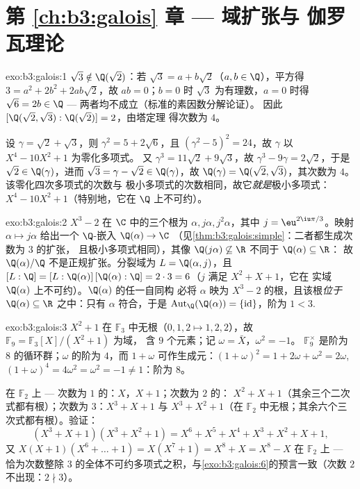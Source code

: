 \section*{第 \ref{ch:b3:galois} 章 --- 域扩张与
伽罗瓦理论}

\begin{solution}{exo:b3:galois:1}
$\sqrt3 \notin \Q(\sqrt2)$：若 $\sqrt3 = a + b\sqrt2$（$a, b
\in \Q$），平方得 $3 = a^2 + 2b^2 + 2ab\sqrt2$，故 $ab =
0$；$b = 0$ 时 $\sqrt3$ 为有理数，$a = 0$ 时得 $\sqrt6 = 2b
\in \Q$ --- 两者均不成立（标准的素因数分解论证）。
因此 $[\Q(\sqrt2,\sqrt3) : \Q(\sqrt2)] = 2$，由塔定理
得次数为 $4$。

设 $\gamma = \sqrt2 + \sqrt3$，则 $\gamma^2 = 5 + 2\sqrt6$，且
$(\gamma^2 - 5)^2 = 24$，故 $\gamma$ 以 $X^4 - 10X^2 + 1$ 为零化多项式。
又 $\gamma^3 = 11\sqrt2 + 9\sqrt3$，故 $\gamma^3 - 9\gamma
= 2\sqrt2$，于是 $\sqrt2 \in \Q(\gamma)$，进而 $\sqrt3 = \gamma -
\sqrt2 \in \Q(\gamma)$，故 $\Q(\gamma) = \Q(\sqrt2,\sqrt3)$，其次数为
$4$。该零化四次多项式的次数与
极小多项式的次数相同，故它\emph{就是}极小多项式：$X^4 -
10X^2 + 1$（特别地，它在 $\Q$ 上不可约）。
\end{solution}

\begin{solution}{exo:b3:galois:2}
$X^3 - 2$ 在 $\C$ 中的三个根为 $\alpha, j\alpha,
j^2\alpha$，其中 $j = \eu^{2\iu\pi/3}$。映射 $\alpha \mapsto
j\alpha$ 给出一个 $\Q$-嵌入 $\Q(\alpha) \to \C$
（见\cref{thm:b3:galois:simple}：二者都生成次数为 $3$ 的扩张，
且极小多项式相同），其像 $\Q(j\alpha)
\not\subseteq \R$ 不同于 $\Q(\alpha) \subseteq \R$：
故 $\Q(\alpha)/\Q$ 不是正规扩张。分裂域为 $L =
\Q(\alpha, j)$，且 $[L:\Q] = [L:\Q(\alpha)]\,[\Q(\alpha):\Q] =
2 \cdot 3 = 6$（$j$ 满足 $X^2 + X + 1$，它在
实域 $\Q(\alpha)$ 上不可约）。$\Q(\alpha)$ 的任一自同构
必将 $\alpha$ 映为 $X^3 - 2$ 的根，且该根\emph{位于}
$\Q(\alpha) \subseteq \R$ 之中：只有 $\alpha$ 符合，于是
$\operatorname{Aut}_\Q(\Q(\alpha)) = \{\mathrm{id}\}$，阶为
$1 < 3$.
\end{solution}

\begin{solution}{exo:b3:galois:3}
$X^2 + 1$ 在 $\mathbb F_3$ 中无根（$0, 1, 2 \mapsto 1, 2,
2$），故 $\mathbb F_9 = \mathbb F_3[X]/(X^2+1)$ 为域，
含 $9$ 个元素；记 $\omega = \bar X$，$\omega^2 = -1$。
$\mathbb F_9^\times$ 是阶为 $8$ 的循环群；$\omega$ 的阶为
$4$，而 $1 + \omega$ 可作生成元：$(1+\omega)^2 = 1 + 2\omega +
\omega^2 = 2\omega$, $(1+\omega)^4 = 4\omega^2 = \omega^2 = -1
\ne 1$：阶为 $8$。

在 $\mathbb F_2$ 上 --- 次数为 $1$ 的：$X$，$X + 1$；次数为 $2$ 的：
$X^2 + X + 1$（其余三个二次式都有根）；次数为
$3$：$X^3 + X + 1$ 与 $X^3 + X^2 + 1$（在 $\mathbb
F_2$ 中无根；其余六个三次式都有根）。验证：
\[
(X^3{+}X{+}1)(X^3{+}X^2{+}1) = X^6 + X^5 + X^4 + X^3 + X^2 + X
+ 1,
\]
又 $X(X{+}1)(X^6 + \dots + 1) = X(X^7 + 1) = X^8 + X = X^8 -
X$ 在 $\mathbb F_2$ 上 --- 恰为次数整除
$3$ 的全体不可约多项式之积，与\cref{exo:b3:galois:6}的预言一致（次数 $2$
不出现：$2 \nmid 3$）。
\end{solution}

